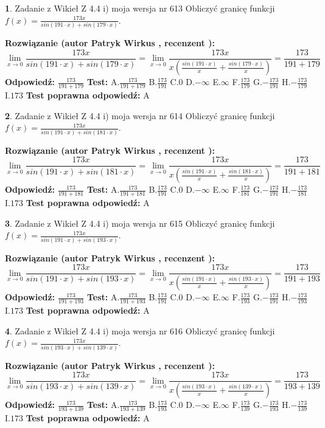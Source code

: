 \documentclass[12pt, a4paper]{article}
\theoremstyle{definition} %
\newtheorem{zad}{}
\newcommand{\zadStart}[1]{\begin{zad}#1\newline}
\newcommand{\zadStop}{\end{zad}}
\newcommand{\rozwStart}[2]{\noindent \textbf{Rozwiązanie (autor #1 , recenzent #2): }\newline}
\newcommand{\rozwStop}{\newline}
\newcommand{\odpStart}{\noindent \textbf{Odpowiedź:}\newline}
\newcommand{\odpStop}{\newline}
\newcommand{\testStart}{\noindent \textbf{Test:}\newline}
\newcommand{\testStop}{\newline}
\newcommand{\kluczStart}{\noindent \textbf{Test poprawna odpowiedź:}\newline}
\newcommand{\kluczStop}{\newline}
\begin{document}
\zadStart{Zadanie z Wikieł Z 4.4 i) moja wersja nr 613}
Obliczyć granicę funkcji $f(x)=\frac{173x}{sin(191\cdot x) +sin(179\cdot x)}$.
\zadStop
\rozwStart{Patryk Wirkus}{}
$$\lim\limits_{x\to 0}\frac{173x}{sin(191\cdot x) +sin(179\cdot x)}=\lim\limits_{x\to 0}\frac{173x}{x(\frac{sin(191\cdot x)}{x}+\frac{sin(179\cdot x)}{x})}=\frac{173}{191+179}$$
\rozwStop
\odpStart
$\frac{173}{191+179}$
\odpStop
\testStart
A.$\frac{173}{191+179}$
B.$\frac{173}{191}$
C.$0$
D.$-\infty$
E.$\infty$
F.$\frac{173}{179}$
G.$-\frac{173}{191}$
H.$-\frac{173}{179}$
I.$173$
\testStop
\kluczStart
A
\kluczStop



\zadStart{Zadanie z Wikieł Z 4.4 i) moja wersja nr 614}
Obliczyć granicę funkcji $f(x)=\frac{173x}{sin(191\cdot x) +sin(181\cdot x)}$.
\zadStop
\rozwStart{Patryk Wirkus}{}
$$\lim\limits_{x\to 0}\frac{173x}{sin(191\cdot x) +sin(181\cdot x)}=\lim\limits_{x\to 0}\frac{173x}{x(\frac{sin(191\cdot x)}{x}+\frac{sin(181\cdot x)}{x})}=\frac{173}{191+181}$$
\rozwStop
\odpStart
$\frac{173}{191+181}$
\odpStop
\testStart
A.$\frac{173}{191+181}$
B.$\frac{173}{191}$
C.$0$
D.$-\infty$
E.$\infty$
F.$\frac{173}{181}$
G.$-\frac{173}{191}$
H.$-\frac{173}{181}$
I.$173$
\testStop
\kluczStart
A
\kluczStop



\zadStart{Zadanie z Wikieł Z 4.4 i) moja wersja nr 615}
Obliczyć granicę funkcji $f(x)=\frac{173x}{sin(191\cdot x) +sin(193\cdot x)}$.
\zadStop
\rozwStart{Patryk Wirkus}{}
$$\lim\limits_{x\to 0}\frac{173x}{sin(191\cdot x) +sin(193\cdot x)}=\lim\limits_{x\to 0}\frac{173x}{x(\frac{sin(191\cdot x)}{x}+\frac{sin(193\cdot x)}{x})}=\frac{173}{191+193}$$
\rozwStop
\odpStart
$\frac{173}{191+193}$
\odpStop
\testStart
A.$\frac{173}{191+193}$
B.$\frac{173}{191}$
C.$0$
D.$-\infty$
E.$\infty$
F.$\frac{173}{193}$
G.$-\frac{173}{191}$
H.$-\frac{173}{193}$
I.$173$
\testStop
\kluczStart
A
\kluczStop



\zadStart{Zadanie z Wikieł Z 4.4 i) moja wersja nr 616}
Obliczyć granicę funkcji $f(x)=\frac{173x}{sin(193\cdot x) +sin(139\cdot x)}$.
\zadStop
\rozwStart{Patryk Wirkus}{}
$$\lim\limits_{x\to 0}\frac{173x}{sin(193\cdot x) +sin(139\cdot x)}=\lim\limits_{x\to 0}\frac{173x}{x(\frac{sin(193\cdot x)}{x}+\frac{sin(139\cdot x)}{x})}=\frac{173}{193+139}$$
\rozwStop
\odpStart
$\frac{173}{193+139}$
\odpStop
\testStart
A.$\frac{173}{193+139}$
B.$\frac{173}{193}$
C.$0$
D.$-\infty$
E.$\infty$
F.$\frac{173}{139}$
G.$-\frac{173}{193}$
H.$-\frac{173}{139}$
I.$173$
\testStop
\kluczStart
A
\kluczStop
\end{document}
